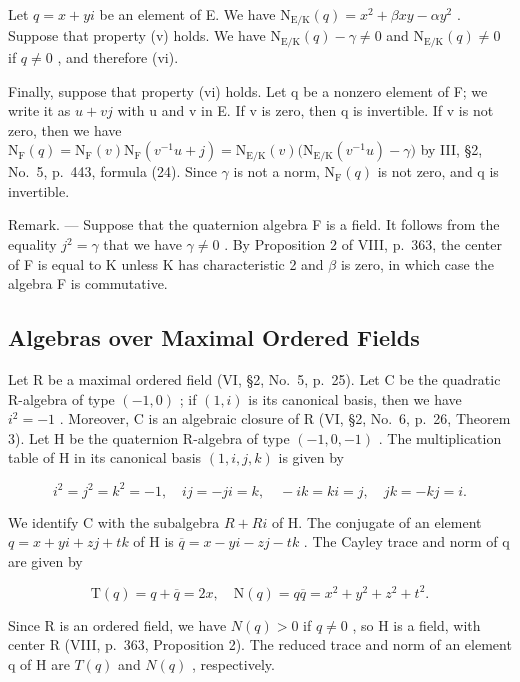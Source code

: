 Let \(q = x + yi\) be an element of E. We have \(\mathrm{N}_{\mathrm{E / K}}(q) = x^2 + \beta xy - \alpha y^2\) . Suppose that property (v) holds. We have \(\mathrm{N}_{\mathrm{E / K}}(q) - \gamma \neq 0\) and \(\mathrm{N}_{\mathrm{E / K}}(q) \neq 0\) if \(q \neq 0\) , and therefore (vi).

Finally, suppose that property (vi) holds. Let q be a nonzero element of F; we write it as \(u + vj\) with u and v in E. If v is zero, then q is invertible. If v is not zero, then we have \(\mathrm{N}_{\mathrm{F}}(q) = \mathrm{N}_{\mathrm{F}}(v)\mathrm{N}_{\mathrm{F}}(v^{-1}u + j) = \mathrm{N}_{\mathrm{E}/\mathrm{K}}(v)\big(\mathrm{N}_{\mathrm{E}/\mathrm{K}}(v^{-1}u) - \gamma\big)\) by III, §2, No.~5, p.~443, formula (24). Since \(\gamma\) is not a norm, \(\mathrm{N}_{\mathrm{F}}(q)\) is not zero, and q is invertible.

Remark. --- Suppose that the quaternion algebra F is a field. It follows from the equality \(j^{2} = \gamma\) that we have \(\gamma \neq 0\) . By Proposition 2 of VIII, p.~363, the center of F is equal to K unless K has characteristic 2 and \(\beta\) is zero, in which case the algebra F is commutative.

\subsection{Algebras over Maximal Ordered Fields}

Let R be a maximal ordered field (VI, §2, No.~5, p.~25). Let C be the quadratic R-algebra of type \((-1,0)\) ; if \((1,i)\) is its canonical basis, then we have \(i^{2}=-1\) . Moreover, C is an algebraic closure of R (VI, §2, No.~6, p.~26, Theorem 3). Let H be the quaternion R-algebra of type \((-1,0,-1)\) . The multiplication table of H in its canonical basis \((1,i,j,k)\) is given by

\[
i ^ {2} = j ^ {2} = k ^ {2} = - 1, \quad i j = - j i = k, \quad - i k = k i = j, \quad j k = - k j = i.
\]

We identify C with the subalgebra \(R + Ri\) of H. The conjugate of an element \(q = x + yi + zj + tk\) of H is \(\overline{q} = x - yi - zj - tk\) . The Cayley trace and norm of q are given by

\[
\mathrm{T} (q) = q + \overline {{q}} = 2 x, \quad \mathrm{N} (q) = q \overline {{q}} = x ^ {2} + y ^ {2} + z ^ {2} + t ^ {2}.
\]

Since R is an ordered field, we have \(N(q) > 0\) if \(q \neq 0\) , so H is a field, with center R (VIII, p.~363, Proposition 2). The reduced trace and norm of an element q of H are \(T(q)\) and \(N(q)\) , respectively.

